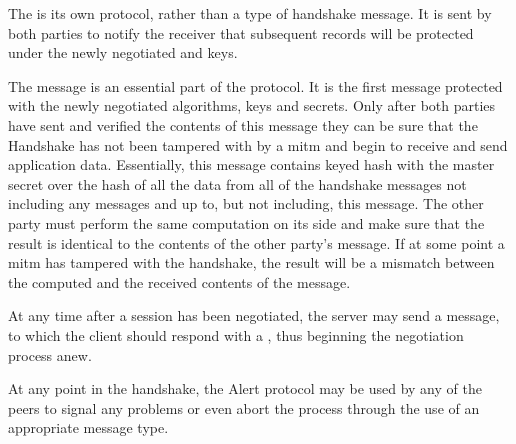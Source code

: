 \documentclass{llncs}
\begin{document}
The  is its own protocol, rather than a type of handshake
message. It is sent by both parties to notify the receiver that subsequent records
will be protected under the newly negotiated  and keys.

The  message is an essential part of the protocol. It is the first
message protected with the newly negotiated algorithms, keys and secrets. Only after
both parties have sent and verified the contents of this message they can
be sure that the Handshake has not been tampered with by a \gls{mitm} and begin to
receive and send application data. Essentially, this message contains keyed hash
with the master secret over the hash of all the data from all of the
handshake messages not including any  messages and up to, but
not including, this message. The other party must perform the same computation on its
side and make sure that the result is identical to the contents of the other party's
 message. If at some point a \gls{mitm} has tampered with the
handshake, the result will be a mismatch between the computed and the received contents of the
 message.

At any time after a session has been negotiated, the server may send a 
message, to which the client should respond with a , thus
beginning the negotiation process anew.

At any point in the handshake, the Alert protocol may be used by any of the peers
to signal any problems or even abort the process through the use of an appropriate message type.
\end{document}
